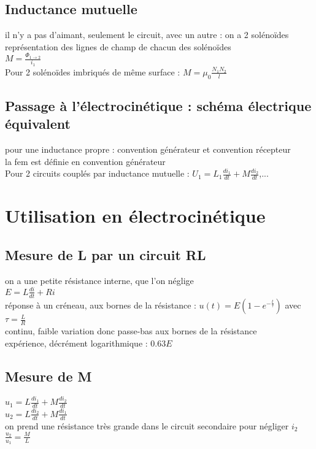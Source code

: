 \subsection{Inductance mutuelle}
il n'y a pas d'aimant, seulement le circuit, avec un autre : on a 2 solénoïdes \\
représentation des lignes de champ de chacun des solénoïdes \\
$M=\frac{\Phi_{1 \rightarrow 2}}{i_1}$ \\
Pour 2 solénoïdes imbriqués de même surface : $M=\mu_0 \frac{N_1 N_2}{l}$
\subsection{Passage à l'électrocinétique : schéma électrique équivalent}
pour une inductance propre : convention générateur et convention récepteur \\
la fem est définie en convention générateur \\
Pour 2 circuits couplés par inductance mutuelle : $U_1=L_1 \frac{di_1}{dt} + M \frac{di_2}{dt}$,...

\section{Utilisation en électrocinétique}
\subsection{Mesure de L par un circuit RL}
on a une petite résistance interne, que l'on néglige \\
$E=L \frac{di}{dt}+R i$ \\
réponse à un créneau, aux bornes de la résistance : $u(t)=E \left( 1-e^{-\frac{t}{\tau}} \right) $ avec $\tau = \frac{L}{R}$ \\
continu, faible variation donc passe-bas aux bornes de la résistance \\

expérience, décrément logarithmique : $0.63 E$ \\

\subsection{Mesure de M}
$u_1=L \frac{di_1}{dt}+M \frac{di_2}{dt}$ \\
$u_2=L \frac{di_2}{dt}+M \frac{di_1}{dt}$ \\
on prend une résistance très grande dans le circuit secondaire pour négliger $i_2$ \\
$\frac{u_2}{u_1}=\frac{M}{L}$



